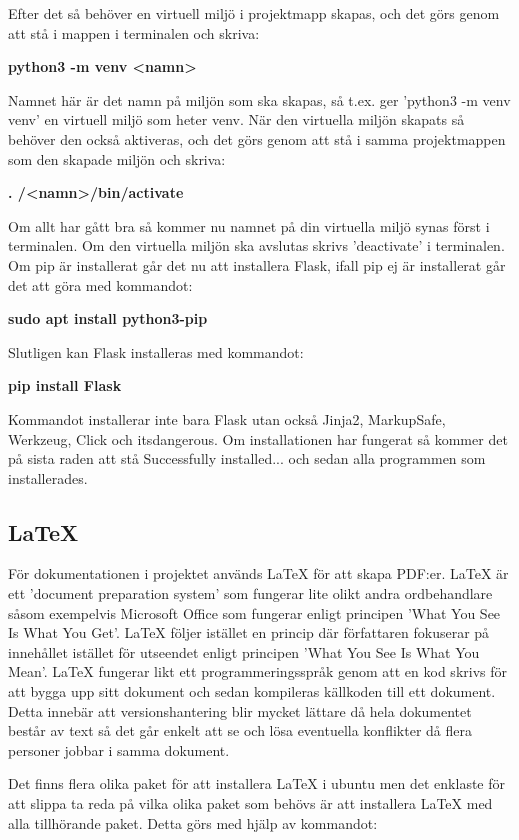 \documentclass{TDP003mall}
\begin{document}
{Efter det så behöver en virtuell miljö i projektmapp skapas, och det görs genom att stå i mappen i terminalen och skriva:

\textbf{python3 -m venv <namn>}

Namnet här är det namn på miljön som ska skapas, så t.ex. ger 'python3 -m venv venv' en virtuell miljö som heter venv. När den virtuella miljön skapats så behöver den också aktiveras, och det görs genom att stå i samma projektmappen som den skapade miljön och skriva:

\textbf{. /<namn>/bin/activate}

Om allt har gått bra så kommer nu namnet på din virtuella miljö synas först i terminalen. Om den virtuella miljön ska avslutas skrivs 'deactivate' i terminalen. Om pip är installerat går det nu att installera Flask, ifall pip ej är installerat går det att göra med kommandot:

\textbf{sudo apt install python3-pip}

Slutligen kan Flask installeras med kommandot:

\textbf{pip install Flask}

Kommandot installerar inte bara Flask utan också Jinja2, MarkupSafe, Werkzeug, Click och itsdangerous. Om installationen har fungerat så kommer det på sista raden att stå Successfully installed... och sedan alla programmen som installerades.

\subsection*{LaTeX}
För dokumentationen i projektet används LaTeX för att skapa PDF:er. LaTeX är ett 'document preparation system' som fungerar lite olikt andra ordbehandlare såsom exempelvis Microsoft Office som fungerar enligt principen 'What You See Is What You Get'. LaTeX följer istället en princip där författaren fokuserar på innehållet istället för utseendet enligt principen 'What You See Is What You Mean'. LaTeX fungerar likt ett programmeringsspråk genom att en kod skrivs för att bygga upp sitt dokument och sedan kompileras källkoden till ett dokument. Detta innebär att versionshantering blir mycket lättare då hela dokumentet består av text så det går enkelt att se och lösa eventuella konflikter då flera personer jobbar i samma dokument.

Det finns flera olika paket för att installera LaTeX i ubuntu men det enklaste för att slippa ta reda på vilka olika paket som behövs är att installera LaTeX med alla tillhörande paket. Detta görs med hjälp av kommandot:

}
\end{document}
